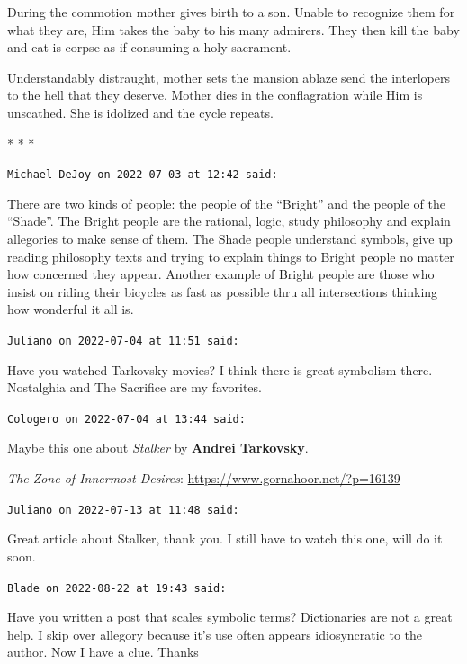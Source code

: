 During the commotion mother gives birth to a son. Unable to recognize them for what they are, Him takes the baby to his many admirers. They then kill the baby and eat is corpse as if consuming a holy sacrament.

Understandably distraught, mother sets the mansion ablaze send the interlopers to the hell that they deserve. Mother dies in the conflagration while Him is unscathed. She is idolized and the cycle repeats.



\begin{center}* * *\end{center}

\begin{footnotesize}
\begin{sffamily}
\texttt{Michael DeJoy on 2022-07-03 at 12:42 said:}

There are two kinds of people: the people of the ``Bright'' and the people of the ``Shade''. The Bright people are the rational, logic, study philosophy and explain allegories to make sense of them. The Shade people understand symbols, give up reading philosophy texts and trying to explain things to Bright people no matter how concerned they appear. Another example of Bright people are those who insist on riding their bicycles as fast as possible thru all intersections thinking how wonderful it all is.

\hfill

\texttt{Juliano on 2022-07-04 at 11:51 said:}

Have you watched Tarkovsky movies? I think there is great symbolism there. Nostalghia and The Sacrifice are my favorites.

\hfill

\texttt{Cologero on 2022-07-04 at 13:44 said:}

Maybe this one about \emph{Stalker} by \textbf{Andrei Tarkovsky}.

\textit{The Zone of Innermost Desires}: \url{https://www.gornahoor.net/?p=16139}


\hfill

\texttt{Juliano on 2022-07-13 at 11:48 said:}

Great article about Stalker, thank you. I still have to watch this one, will do it soon.

\hfill

\texttt{Blade on 2022-08-22 at 19:43 said:}

Have you written a post that scales symbolic terms? Dictionaries are not a great help. I skip over allegory because it's use often appears idiosyncratic to the author. Now I have a clue. Thanks


\end{sffamily}
\end{footnotesize}
